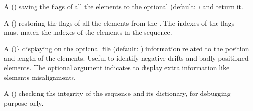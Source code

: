 \documentclass[letterpaper,10pt,english]{sphinxmanual}
\begin{document}
\begin{description}
\sphinxAtStartPar
A  (\sphinxcode{\sphinxupquote{{[}flgs{]}}}) saving the flags of all the elements to the optional   (default: \sphinxcode{\sphinxupquote{\{\}}}) and return it.

\sphinxAtStartPar
A  () restoring the flags of all the elements from the  . The indexes of the flags must match the indexes of the elements
in the sequence.

\sphinxAtStartPar
A  (\sphinxcode{\sphinxupquote{{[}fil{]}, {[}info{]}}})\} displaying on the optional file  (default: ) information related to the position and length of the elements.
Useful to identify negative drifts and badly positioned elements. The optional argument  indicates to display extra information like elements misalignments.

\sphinxAtStartPar
A  () checking the integrity of the sequence and its dictionary, for debugging purpose only.

\end{description}
\end{document}

